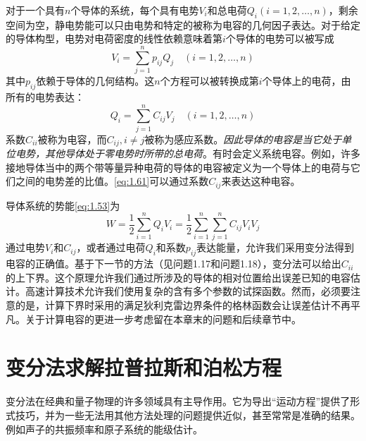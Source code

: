 \documentclass[12pt]{book}
\numberwithin{equation}{chapter}
\numberwithin{figure}{chapter}
\numberwithin{footnote}{page}
\begin{document}
对于一个具有$n$个导体的系统，每个具有电势$V_i$和总电荷$Q_i(i=1,2,\dots,n)$，剩余空间为空，静电势能可以只由电势和特定的被称为电容的几何因子表达。对于给定的导体构型，电势对电荷密度的线性依赖意味着第$i$个导体的电势可以被写成
$$V_i=\sum_{j=1}^n p_{ij}Q_j \quad (i=1,2,\dots,n)$$
其中$p_{ij}$依赖于导体的几何结构。这$n$个方程可以被转换成第$i$个导体上的电荷，由所有的电势表达：
\begin{equation}\label{eq:1.61}
    Q_i=\sum_{j=1}^n C_{ij}V_j \quad (i=1,2,\dots,n)
\end{equation}
系数$C_{ii}$被称为电容，而$C_{ij},i\neq j$被称为感应系数。\textit{因此导体的电容是当它处于单位电势，其他导体处于零电势时所带的总电荷}。有时会定义系统电容。例如，许多接地导体当中的两个带等量异种电荷的导体的电容被定义为一个导体上的电荷与它们之间的电势差的比值。\autoref{eq:1.61}可以通过系数$C_{ij}$来表达这种电容。

导体系统的势能\autoref{eq:1.53}为
\begin{equation}\label{eq:1.62}
    W=\frac{1}{2}\sum_{i=1}^n Q_iV_i=\frac{1}{2}\sum_{i=1}^n\sum_{j=1}^n C_{ij}V_iV_j
\end{equation}
通过电势$V_i$和$C_{ij}$，或者通过电荷$Q_i$和系数$p_{ij}$表达能量，允许我们采用变分法得到电容的正确值。基于下一节的方法（见问题1.17和问题1.18），变分法可以给出$C_{ii}$的上下界。这个原理允许我们通过所涉及的导体的相对位置给出误差已知的电容估计。高速计算技术允许我们使用复杂的含有多个参数的试探函数。然而，必须要注意的是，计算下界时采用的满足狄利克雷边界条件的格林函数会让误差估计不再平凡。关于计算电容的更进一步考虑留在本章末的问题和后续章节中。

\section{变分法求解拉普拉斯和泊松方程}\label{sec:1.12}

变分法在经典和量子物理的许多领域具有主导作用。它为导出“运动方程”提供了形式技巧，并为一些无法用其他方法处理的问题提供近似，甚至常常是准确的结果。例如声子的共振频率和原子系统的能级估计。
\end{document}

